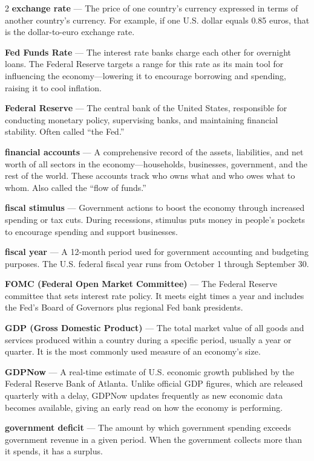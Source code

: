 \begin{multicols}{2}
\textbf{exchange rate} --- The price of one country's currency expressed in terms of another country's currency. For example, if one U.S. dollar equals 0.85 euros, that is the dollar-to-euro exchange rate.

\textbf{Fed Funds Rate} --- The interest rate banks charge each other for overnight loans. The Federal Reserve targets a range for this rate as its main tool for influencing the economy---lowering it to encourage borrowing and spending, raising it to cool inflation.

\textbf{Federal Reserve} --- The central bank of the United States, responsible for conducting monetary policy, supervising banks, and maintaining financial stability. Often called ``the Fed.''

\textbf{financial accounts} --- A comprehensive record of the assets, liabilities, and net worth of all sectors in the economy---households, businesses, government, and the rest of the world. These accounts track who owns what and who owes what to whom. Also called the ``flow of funds.''

\textbf{fiscal stimulus} --- Government actions to boost the economy through increased spending or tax cuts. During recessions, stimulus puts money in people's pockets to encourage spending and support businesses.

\textbf{fiscal year} --- A 12-month period used for government accounting and budgeting purposes. The U.S. federal fiscal year runs from October 1 through September 30.

\textbf{FOMC (Federal Open Market Committee)} --- The Federal Reserve committee that sets interest rate policy. It meets eight times a year and includes the Fed's Board of Governors plus regional Fed bank presidents.

\textbf{GDP (Gross Domestic Product)} --- The total market value of all goods and services produced within a country during a specific period, usually a year or quarter. It is the most commonly used measure of an economy's size.

\textbf{GDPNow} --- A real-time estimate of U.S. economic growth published by the Federal Reserve Bank of Atlanta. Unlike official GDP figures, which are released quarterly with a delay, GDPNow updates frequently as new economic data becomes available, giving an early read on how the economy is performing.

\textbf{government deficit} --- The amount by which government spending exceeds government revenue in a given period. When the government collects more than it spends, it has a surplus.


\end{multicols}
